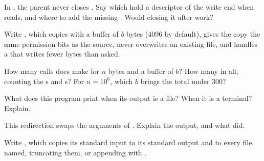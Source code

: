 \begin{exercise}[$\star$]\label{exo:b2:files-pipes-signals:2}
In , the parent never closes . Say which  hold a descriptor of the write
end when  reads, and where to add the missing . Would closing it after  work?
\end{exercise}

\begin{exercise}[$\star$]\label{exo:b2:files-pipes-signals:3}
Write , which copies with a buffer of $b$ bytes (4096 by default), gives the copy the same
permission bits as the source, never overwrites an existing file, and handles a  that writes fewer bytes
than asked.
\end{exercise}

\begin{exercise}[$\star$]\label{exo:b2:files-pipes-signals:4}
How many  calls does  make for $n$ bytes and a buffer of $b$? How many  in all,
counting the s and s? For $n = 10^6$, which $b$ brings the total under 300?
\end{exercise}

\begin{exercise}[$\star\star$]\label{exo:b2:files-pipes-signals:5}
What does this program print when its output is a file? When it is a terminal? Explain.
\end{exercise}

\begin{exercise}[$\star\star$]\label{exo:b2:files-pipes-signals:6}
This redirection swaps the arguments of . Explain the output, and what  did.
\end{exercise}

\begin{exercise}[$\star\star$]\label{exo:b2:files-pipes-signals:7}
Write , which copies its standard input to its standard output and to every file named,
truncating them, or appending with .
\end{exercise}

